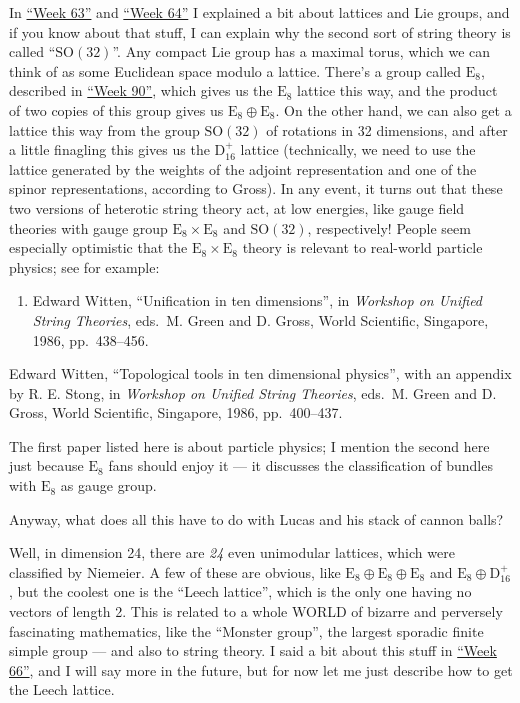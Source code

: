 \documentclass{article}
\def\tightlist{}
\begin{document}
In \protect\hyperlink{week63}{``Week 63''} and
\protect\hyperlink{week64}{``Week 64''} I explained a bit about lattices
and Lie groups, and if you know about that stuff, I can explain why the
second sort of string theory is called ``\(\mathrm{SO}(32)\)''. Any
compact Lie group has a maximal torus, which we can think of as some
Euclidean space modulo a lattice. There's a group called
\(\mathrm{E}_8\), described in \protect\hyperlink{week90}{``Week 90''},
which gives us the \(\mathrm{E}_8\) lattice this way, and the product of
two copies of this group gives us \(\mathrm{E}_8\oplus\mathrm{E}_8\). On
the other hand, we can also get a lattice this way from the group
\(\mathrm{SO}(32)\) of rotations in 32 dimensions, and after a little
finagling this gives us the \(\mathrm{D}_{16}^+\) lattice (technically,
we need to use the lattice generated by the weights of the adjoint
representation and one of the spinor representations, according to
Gross). In any event, it turns out that these two versions of heterotic
string theory act, at low energies, like gauge field theories with gauge
group \(\mathrm{E}_8\times\mathrm{E}_8\) and \(\mathrm{SO}(32)\),
respectively! People seem especially optimistic that the
\(\mathrm{E}_8\times\mathrm{E}_8\) theory is relevant to real-world
particle physics; see for example:

\begin{enumerate}
\def\labelenumi{\arabic{enumi})}
\setcounter{enumi}{5}
\tightlist
\item
  Edward Witten, ``Unification in ten dimensions'', in \emph{Workshop on
  Unified String Theories}, eds.~M. Green and D. Gross, World
  Scientific, Singapore, 1986, pp.~438--456.
\end{enumerate}

Edward Witten, ``Topological tools in ten dimensional physics'', with an
appendix by R. E. Stong, in \emph{Workshop on Unified String Theories},
eds.~M. Green and D. Gross, World Scientific, Singapore, 1986,
pp.~400--437.

The first paper listed here is about particle physics; I mention the
second here just because \(\mathrm{E}_8\) fans should enjoy it --- it
discusses the classification of bundles with \(\mathrm{E}_8\) as gauge
group.

Anyway, what does all this have to do with Lucas and his stack of cannon
balls?

Well, in dimension 24, there are \emph{24} even unimodular lattices,
which were classified by Niemeier. A few of these are obvious, like
\(\mathrm{E}_8\oplus\mathrm{E}_8\oplus\mathrm{E}_8\) and
\(\mathrm{E}_8\oplus\mathrm{D}_{16}^+\), but the coolest one is the
``Leech lattice'', which is the only one having no vectors of length 2.
This is related to a whole WORLD of bizarre and perversely fascinating
mathematics, like the ``Monster group'', the largest sporadic finite
simple group --- and also to string theory. I said a bit about this
stuff in \protect\hyperlink{week66}{``Week 66''}, and I will say more in
the future, but for now let me just describe how to get the Leech
lattice.
\end{document}
